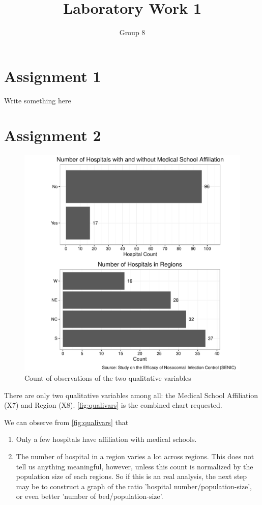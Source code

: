 \documentclass[11pt]{article}
\begin{document}
\author{Group 8}
\title{Laboratory Work 1}
\maketitle

\section{Assignment 1}
Write something here



\section{Assignment 2}

\begin{figure}[ht]
  \centering
  \includegraphics[scale=0.8]{qualitative_vars.pdf}
  \caption{Count of observations of the two
    qualitative variables}
  \label{fig:qualivars}
\end{figure}

There are only two qualitative variables among all: the Medical School
Affiliation (X7) and Region (X8). \autoref{fig:qualivars} is the combined
chart requested.

We can observe from \autoref{fig:qualivars} that
\begin{enumerate}
\item
  Only a few hospitals have affiliation with medical schools.
\item
  The number of hospital in a region varies a lot across regions. This
  does not tell us anything meaningful, however, unless this count is
  normalized by the population size of each regions. So if this is an
  real analysis, the next step may be to construct a graph of the ratio
  'hospital number/population-size', or even better
  'number of bed/population-size'.
\end{enumerate}
\end{document}
